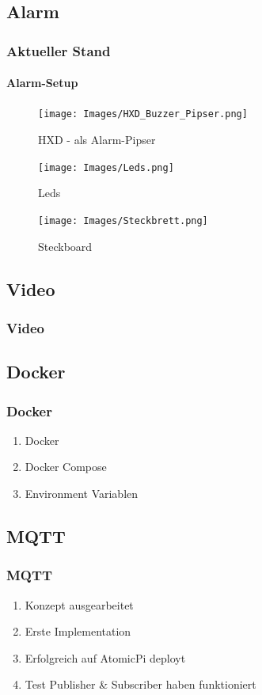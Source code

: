 \documentclass[]{beamer}
\begin{document}
\subsection{Alarm}

\begin{frame}
	\frametitle{Aktueller Stand}
	\framesubtitle{Alarm-Setup}
	\begin{figure}
		\centering
		\begin{minipage}{0.32\textwidth}
			\centering
			\texttt{[image: Images/HXD\_Buzzer\_Pipser.png]} 
			\caption{HXD - als Alarm-Pipser}
		\end{minipage}\hfill
		\begin{minipage}{0.32\textwidth}
			\centering
			\texttt{[image: Images/Leds.png]} 
			\caption{Leds}
		\end{minipage}\hfill
		\begin{minipage}{0.32\textwidth}
			\centering
			\texttt{[image: Images/Steckbrett.png]}
			\caption{Steckboard}
		\end{minipage}
	\end{figure}
	
\end{frame}

\subsection{Video}

\begin{frame}
	\frametitle{Video}
	
\end{frame}


\subsection{Docker}
\begin{frame}
	\frametitle{Docker}
	
	\begin{enumerate}
		\item Docker 
		\item Docker Compose
		\item Environment Variablen
	\end{enumerate}
\end{frame}


\subsection{MQTT}
\begin{frame}
	\frametitle{MQTT}

	\begin{enumerate}
		\item Konzept ausgearbeitet
		\item Erste Implementation
		\item Erfolgreich auf AtomicPi deployt
		\item Test Publisher \& Subscriber haben funktioniert
	\end{enumerate}
\end{frame}
\end{document}
